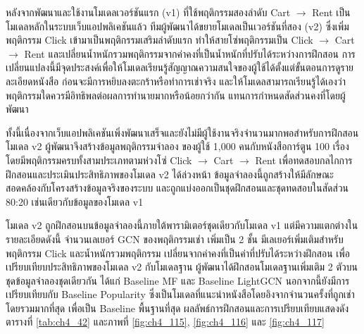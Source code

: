 หลังจากพัฒนาและใช้งานโมเดลเวอร์ชันแรก (v1) ที่ใช้พฤติกรรมสองลำดับ Cart $\to$ Rent เป็นโมเดลหลักในระบบเว็บแอปพลิเคชันแล้ว ทีมผู้พัฒนาได้ขยายโมเดลเป็นเวอร์ชันที่สอง (v2) ซึ่งเพิ่มพฤติกรรม Click เข้ามาเป็นพฤติกรรมเสริมลำดับแรก ทำให้สายโซ่พฤติกรรมเป็น Click $\to$ Cart $\to$ Rent และเปลี่ยนน้ำหนักรวมพฤติกรรมจากค่าคงที่เป็นน้ำหนักที่ปรับได้ระหว่างการฝึกสอน การเปลี่ยนแปลงนี้มีจุดประสงค์เพื่อให้โมเดลเรียนรู้สัญญาณความสนใจของผู้ใช้ได้ตั้งแต่ขั้นตอนการดูรายละเอียดหนังสือ ก่อนจะมีการหยิบลงตะกร้าหรือทำการเช่าจริง และให้โมเดลสามารถเรียนรู้ได้เองว่าพฤติกรรมใดควรมีอิทธิพลต่อผลการทำนายมากหรือน้อยกว่ากัน แทนการกำหนดสัดส่วนคงที่โดยผู้พัฒนา

ทั้งนี้เนื่องจากเว็บแอปพลิเคชันเพิ่งพัฒนาเสร็จและยังไม่มีผู้ใช้งานจริงจำนวนมากพอสำหรับการฝึกสอนโมเดล v2 ผู้พัฒนาจึงสร้างข้อมูลพฤติกรรมจำลอง ของผู้ใช้ 1,000 คนกับหนังสือการ์ตูน 100 เรื่อง โดยมีพฤติกรรมครบทั้งสามประเภทตามห่วงโซ่ Click $\to$ Cart $\to$ Rent เพื่อทดสอบกลไกการฝึกสอนและประเมินประสิทธิภาพของโมเดล v2 ได้ล่วงหน้า ข้อมูลจำลองนี้ถูกสร้างให้มีลักษณะสอดคล้องกับโครงสร้างข้อมูลจริงของระบบ และถูกแบ่งออกเป็นชุดฝึกสอนและชุดทดสอบในสัดส่วน 80:20 เช่นเดียวกับข้อมูลของโมเดล v1

โมเดล v2 ถูกฝึกสอนบนข้อมูลจำลองนี้ภายใต้พารามิเตอร์ชุดเดียวกับโมเดล v1 แต่มีความแตกต่างในรายละเอียดดังนี้ จำนวนเลเยอร์ GCN ของพฤติกรรมเช่า เพิ่มเป็น 2 ชั้น มีเลเยอร์เพิ่มเติมสำหรับพฤติกรรม Click และน้ำหนักรวมพฤติกรรม เปลี่ยนจากค่าคงที่เป็นค่าที่ปรับได้ระหว่างฝึกสอน เพื่อเปรียบเทียบประสิทธิภาพของโมเดล v2 กับโมเดลฐาน ผู้พัฒนาได้ฝึกสอนโมเดลฐานเพิ่มเติม 2 ตัวบนชุดข้อมูลจำลองชุดเดียวกัน ได้แก่ Baseline MF และ Baseline LightGCN นอกจากนี้ยังมีการเปรียบเทียบกับ Baseline Popularity ซึ่งเป็นโมเดลที่แนะนำหนังสือโดยอิงจากจำนวนครั้งที่ถูกเช่าโดยรวมมากที่สุด เพื่อเป็น Baseline พื้นฐานที่สุด ผลลัพธ์การฝึกสอนและการเปรียบเทียบแสดงดังตารางที่ \ref{tab:ch4_42} และภาพที่ \ref{fig:ch4_115}, \ref{fig:ch4_116} และ \ref{fig:ch4_117}

